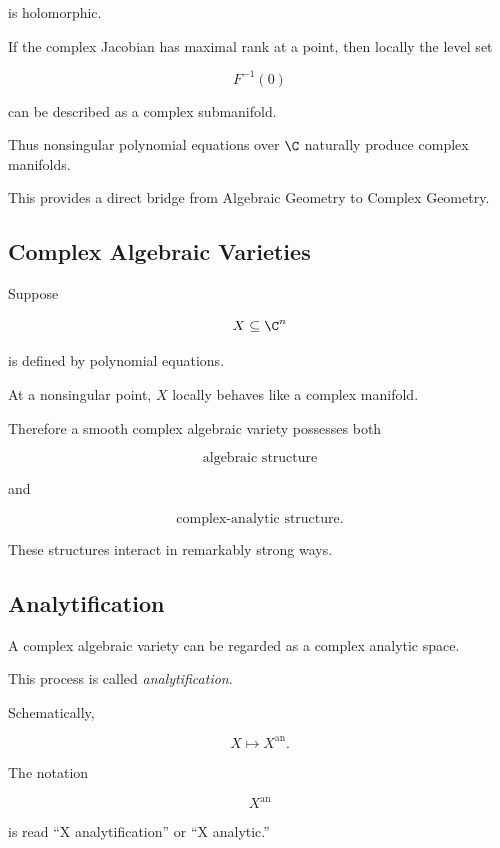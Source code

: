 is holomorphic.

If the complex Jacobian has maximal rank at a point, then locally the level
set

\[
F^{-1}(0)
\]

can be described as a complex submanifold.

Thus nonsingular polynomial equations over \(\C\) naturally produce complex
manifolds.

This provides a direct bridge from Algebraic Geometry to Complex Geometry.

\subsection{Complex Algebraic Varieties}
\label{subsec:complex-algebraic-varieties}

Suppose

\[
X\subseteq\C^n
\]

is defined by polynomial equations.

At a nonsingular point, \(X\) locally behaves like a complex manifold.

Therefore a smooth complex algebraic variety possesses both

\[
\boxed{
\text{algebraic structure}
}
\]

and

\[
\boxed{
\text{complex-analytic structure}.
}
\]

These structures interact in remarkably strong ways.

\subsection{Analytification}
\label{subsec:analytification}

A complex algebraic variety can be regarded as a complex analytic space.

This process is called \emph{analytification}.

Schematically,

\[
\boxed{
X
\longmapsto
X^{\mathrm{an}}.
}
\]

The notation

\[
X^{\mathrm{an}}
\]

is read ``X analytification'' or ``X analytic.''

